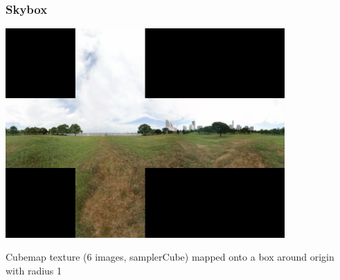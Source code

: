 \documentclass[12pt]{beamer}
\begin{document}
%
    \begin{frame}
        \frametitle{Skybox}
        \includegraphics[width=0.8\textwidth]{yokohama2}

        Cubemap texture (6 images, samplerCube) mapped onto a box around origin with radius 1
    \end{frame}
\end{document}
